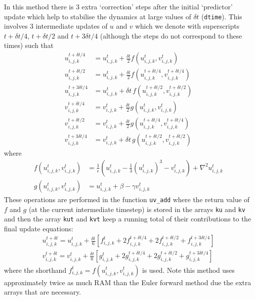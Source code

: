 \documentclass[notitlepage,aps,amsmath,amssymb,11pt]{revtex4-1}
\newcommand{\sqb}[1]{\left[ #1 \right]}
\newcommand{\rndb}[1]{\left( #1 \right)}
\begin{document}
In this method there is 3 extra `correction' steps after the initial `predictor' update which help to stabilise the dynamics at large values of $\delta t$ (\verb'dtime'). This involves 3 intermediate updates of $u$ and $v$ which we denote with superscripts $t+\delta t/4$,  $t+\delta t/2$ and $t+3\delta t/4$ (although the steps do not correspond to these times) such that
\begin{align}
u^{t+\delta t / 4}_{i,j,k} &= u^{t}_{i , j, k} + \frac{\delta t}{2} f\rndb{u_{i,j,k}^t, v_{i,j,k}^t} \\
u^{t+\delta t / 2}_{i,j,k} &= u^{t}_{i , j, k} + \frac{\delta t}{2} f\rndb{u_{i,j,k}^{t+\delta t / 4}, v_{i,j,k}^{t+\delta t / 4}}\\
u^{t+3\delta t / 4}_{i,j,k} &= u^{t}_{i , j, k} + \delta t \, f\rndb{u_{i,j,k}^{t+\delta t / 2}, v_{i,j,k}^{t+\delta t / 2}}\\
v^{t+\delta t / 4}_{i,j,k} &= v^{t}_{i , j, k} + \frac{\delta t}{2} g\rndb{u_{i,j,k}^t, v_{i,j,k}^t} \\
v^{t+\delta t / 2}_{i,j,k} &= v^{t}_{i , j, k} + \frac{\delta t}{2} g\rndb{u_{i,j,k}^{t+\delta t / 4}, v_{i,j,k}^{t+\delta t / 4}}\\
v^{t+3\delta t / 4}_{i,j,k} &= v^{t}_{i , j, k} + \delta t \, g\rndb{u_{i,j,k}^{t+\delta t / 2}, v_{i,j,k}^{t+\delta t / 2}}
\end{align}
where
\begin{align}
f\rndb{u_{i,j,k}^t, v_{i,j,k}^t} &= \frac{1}{\epsilon} \rndb{u^{t}_{i,j,k} - \frac{1}{3}(u^{t}_{i,j,k})^3 - v^{t}_{i,j,k}} + \nabla^2 u^{t}_{i,j,k} \\
g\rndb{u_{i,j,k}^t, v_{i,j,k}^t} &= u^{t}_{i,j,k} + \beta - \gamma v^{t}_{i,j,k}
\end{align}
These operations are performed in the function \verb'uv_add' where the return value of $f$ and $g$ (at the current intermediate timestep) is stored in the arrays \verb'ku' and \verb'kv' and then the array \verb'kut' and \verb'kvt' keep a running total of their contributions to the final update equations:
\begin{align}
u^{t+\delta t}_{i,j,k} = u^{t}_{i , j, k} + \frac{\delta t}{6} \sqb{ f_{i,j,k}^t + 2 f_{i,j,k}^{t+\delta t / 4}  + 2f_{i,j,k}^{t+\delta t / 2} +  f_{i,j,k}^{t+3\delta t / 4}}\\
v^{t+\delta t}_{i,j,k} = v^{t}_{i , j, k} + \frac{\delta t}{6} \sqb{ g_{i,j,k}^t + 2 g_{i,j,k}^{t+\delta t / 4}  + 2g_{i,j,k}^{t+\delta t / 2} +  g_{i,j,k}^{t+3\delta t / 4}}
\end{align}
where the shorthand $f_{i,j,k}^t = f\rndb{u_{i,j,k}^t, v_{i,j,k}^t}$ is used. Note this method uses approximately twice as much RAM than the Euler forward method due the extra arrays that are necessary.
\end{document}
